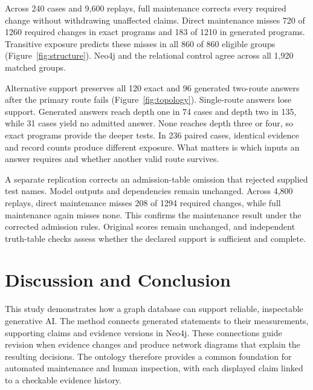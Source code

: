 \documentclass[runningheads]{llncs}
\newcommand{\SemCoreCases}{240}
\newcommand{\SemReplayCells}{9,600}
\newcommand{\SemPredictionGroups}{860}
\newcommand{\SemPredictionAgreement}{860}
\newcommand{\SemParityGroups}{1,920}
\newcommand{\SemSameSize}{236}
\newcommand{\SemRootOne}{74}
\newcommand{\SemRootTwo}{135}
\newcommand{\SemMissingRoots}{31}
\newcommand{\SemAliasCells}{4,800}
\newcommand{\SemAliasRequired}{1294}
\newcommand{\SemAliasMissed}{208}
\newcommand{\SemFixtureRequired}{1260}
\newcommand{\SemFixtureMissed}{720}
\newcommand{\SemFixtureAlternative}{120}
\newcommand{\SemGeneratedRequired}{1210}
\newcommand{\SemGeneratedMissed}{183}
\newcommand{\SemGeneratedAlternative}{96}
\begin{document}
Across \SemCoreCases{} cases and \SemReplayCells{} replays, full maintenance
corrects every required change without withdrawing unaffected claims.
Direct maintenance misses \SemFixtureMissed{} of \SemFixtureRequired{}
required changes in exact programs and \SemGeneratedMissed{} of
\SemGeneratedRequired{} in generated programs.
Transitive exposure predicts these misses in all \SemPredictionAgreement{}
of \SemPredictionGroups{} eligible groups (Figure~\ref{fig:structure}).
Neo4j and the relational control agree across all \SemParityGroups{}
matched groups.

Alternative support preserves all \SemFixtureAlternative{} exact and
\SemGeneratedAlternative{} generated two-route answers after the primary
route fails (Figure~\ref{fig:topology}). Single-route answers lose support.
Generated answers reach depth one in \SemRootOne{} cases and depth two in
\SemRootTwo{}, while \SemMissingRoots{} cases yield no admitted answer.
None reaches depth three or four, so exact programs provide the deeper tests.
In \SemSameSize{} paired cases, identical evidence and record counts produce
different exposure. What matters is which inputs an answer requires and
whether another valid route survives.

A separate replication corrects an admission-table omission that rejected
supplied test names. Model outputs and dependencies remain unchanged.
Across \SemAliasCells{} replays, direct maintenance misses
\SemAliasMissed{} of \SemAliasRequired{} required changes, while full
maintenance again misses none. This confirms the maintenance result under
the corrected admission rules. Original scores remain unchanged, and
independent truth-table checks assess whether the declared support is
sufficient and complete.





\section{Discussion and Conclusion}

This study demonstrates how a graph database can support reliable,
inspectable generative AI. The method connects generated statements to
their measurements, supporting claims and evidence versions in Neo4j.
These connections guide revision when evidence changes and produce
network diagrams that explain the resulting decisions. The ontology
therefore provides a common foundation for automated maintenance and
human inspection, with each displayed claim linked to a checkable
evidence history.
\end{document}
